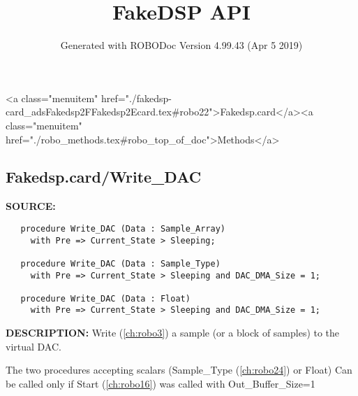 \documentclass{article}
\title{FakeDSP API}
\author{Generated with ROBODoc Version 4.99.43 (Apr  5 2019)
}
\begin{document}
\maketitle
\printindex
\tableofcontents
\newpage

<a class="menuitem" href="./fakedsp-card_adsFakedsp2FFakedsp2Ecard.tex#robo22">Fakedsp.card</a><a class="menuitem" href="./robo_methods.tex#robo_top_of_doc">Methods</a>\subsection{Fakedsp.card/Write\_DAC}
\textbf{SOURCE:}\hspace{0.08in}\begin{verbatim}
   procedure Write_DAC (Data : Sample_Array)
     with Pre => Current_State > Sleeping;

   procedure Write_DAC (Data : Sample_Type)
     with Pre => Current_State > Sleeping and DAC_DMA_Size = 1;
   
   procedure Write_DAC (Data : Float)
     with Pre => Current_State > Sleeping and DAC_DMA_Size = 1;
\end{verbatim}
\textbf{DESCRIPTION:}\hspace{0.08in}
   Write (\ref{ch:robo3}) a sample (or a block of samples) to the virtual DAC.

 

   The two procedures accepting scalars (Sample\_Type (\ref{ch:robo24}) or Float)
   Can be called only if Start (\ref{ch:robo16}) was called with Out\_Buffer\_Size=1
\end{document}
